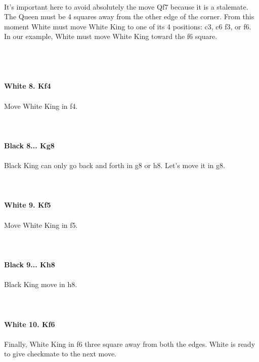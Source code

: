 \documentclass{article}
\begin{document}
\\
It's important here to avoid absolutely the move Qf7 because it is a stalemate. The Queen must be 4 squares away from the other edge of the corner. From this moment White must move White King to one of its 4 positions: c3, c6 f3, or f6. In our example, White must move White King toward the f6 square.\\\\
\\

\\
\\
\textbf{White 8. Kf4}\\
\\
Move White King in f4.\\
\\

\\
\\
\textbf{Black 8... Kg8}\\
\\
Black King can only go back and forth in g8 or h8. Let's move it in g8.\\
\\

\\
\\
\textbf{White 9. Kf5}\\
\\
Move White King in f5.\\
\\

\\
\\
\textbf{Black 9... Kh8}\\
\\
Black King move in h8.\\
\\

\\
\\
\textbf{White 10. Kf6}\\
\\
Finally, White King in f6 three square away from both the edges. White is ready to give checkmate to the next move.\\\\
\\

\end{document}

